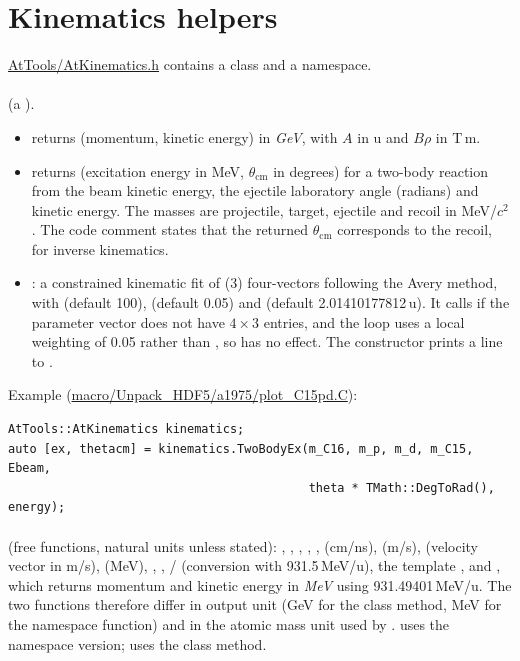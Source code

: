 \section{Kinematics helpers}

\url{AtTools/AtKinematics.h} contains a class and a namespace.

\paragraph{} (a ).
\begin{itemize}
\item {} returns (momentum, kinetic energy) in \emph{GeV}, with $A$ in u and
  $B\rho$ in T\,m.
\item {} returns (excitation energy in MeV,
  $\theta_\mathrm{cm}$ in degrees) for a two-body reaction from the beam kinetic energy, the ejectile laboratory angle
  (radians) and kinetic energy. The masses are projectile, target, ejectile and recoil in MeV/$c^2$. The code comment
  states that the returned $\theta_\mathrm{cm}$ corresponds to the recoil, for inverse kinematics.
\item {}: a constrained kinematic fit of  (3) four-vectors following
  the Avery method, with  (default 100),  (default 0.05) and
   (default 2.01410177812\,u). It calls  if the parameter vector does not
  have $4\times3$ entries, and the loop uses a local weighting of 0.05 rather than , so
   has no effect. The constructor prints a line to .
\end{itemize}
Example (\url{macro/Unpack_HDF5/a1975/plot_C15pd.C}):
\begin{verbatim}
AtTools::AtKinematics kinematics;
auto [ex, thetacm] = kinematics.TwoBodyEx(m_C16, m_p, m_d, m_C15, Ebeam,
                                          theta * TMath::DegToRad(), energy);
\end{verbatim}

\paragraph{} (free functions, natural units unless stated):
, , , ,
,  (cm/ns),  (m/s),
 (velocity vector in m/s),  (MeV), ,
, / (conversion with 931.5\,MeV/u), the template
, and , which returns momentum and kinetic energy in
\emph{MeV} using 931.49401\,MeV/u. The two  functions therefore differ in output unit (GeV
for the class method, MeV for the namespace function) and in the atomic mass unit used by .
 uses the namespace version;  uses the class method.


